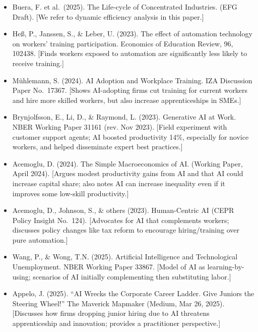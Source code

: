 \documentclass[12pt]{article}
\begin{document}
\begin{itemize}
\tightlist
\item
  Buera, F. et al.~(2025). {The Life-cycle of Concentrated
  Industries}. (EFG Draft). {[}We refer to dynamic efficiency analysis
  in this paper.{]}
\item
  Heß, P., Janssen, S., \& Leber, U. (2023). {The effect of
  automation technology on workers' training participation}.
  {Economics of Education Review, 96}, 102438. {[}Finds workers
  exposed to automation are significantly less likely to receive
  training.{]}
\item
  Mühlemann, S. (2024). {AI Adoption and Workplace Training}. IZA
  Discussion Paper No.~17367. {[}Shows AI-adopting firms cut training
  for current workers and hire more skilled workers, but also increase
  apprenticeships in SMEs.{]}
\item
  Brynjolfsson, E., Li, D., \& Raymond, L. (2023). {Generative AI
  at Work}. NBER Working Paper 31161 (rev. Nov 2023). {[}Field
  experiment with customer support agents; AI boosted productivity 14\%,
  especially for novice workers, and helped disseminate expert best
  practices.{]}
\item
  Acemoglu, D. (2024). {The Simple Macroeconomics of AI}. (Working
  Paper, April 2024). {[}Argues modest productivity gains from AI and
  that AI could increase capital share; also notes AI can increase
  inequality even if it improves some low-skill productivity.{]}
\item
  Acemoglu, D., Johnson, S., \& others (2023). {Human-Centric AI}
  (CEPR Policy Insight No.~124). {[}Advocates for AI that complements
  workers; discusses policy changes like tax reform to encourage
  hiring/training over pure automation.{]}
\item
  Wang, P., \& Wong, T.N. (2025). {Artificial Intelligence and
  Technological Unemployment}. NBER Working Paper 33867. {[}Model of AI
  as learning-by-using; scenarios of AI initially complementing then
  substituting labor.{]}
\item
  Appelo, J. (2025). ``AI Wrecks the Corporate Career Ladder. Give
  Juniors the Steering Wheel!'' {The Maverick Mapmaker} (Medium,
  Mar 26, 2025). {[}Discusses how firms dropping junior hiring due to AI
  threatens apprenticeship and innovation; provides a practitioner
  perspective.{]}
\end{itemize}
\end{document}
